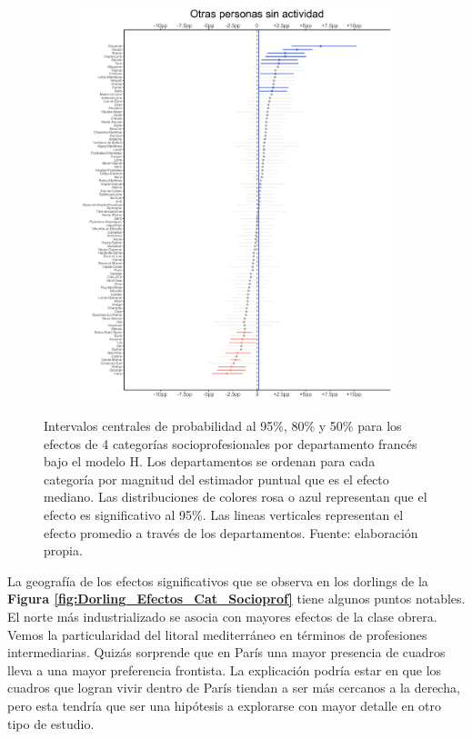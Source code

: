 \begin{figure}
\begin{subfigure}{0.45\textwidth}
	\end{subfigure}
	~
	\begin{subfigure}{0.45\textwidth}
	\includegraphics[width = \textwidth]{Figs/Efectos/Efectos_CSP8_Modelo_H}
	\end{subfigure}
	\caption{Intervalos centrales de probabilidad al 95\%, 80\% y 50\% para los efectos de 4 categorías socioprofesionales por departamento francés bajo el modelo H. Los departamentos se ordenan para cada categoría por magnitud del estimador puntual que es el efecto mediano. Las distribuciones de colores rosa o azul representan que el efecto es significativo al 95\%. Las lineas verticales representan el efecto promedio a través de los departamentos. Fuente: elaboración propia.}
	\label{fig:Efectos_Cat_Socioprof_2}
\end{figure}

La geografía de los efectos significativos que se observa en los dorlings de la \textbf{Figura \ref{fig:Dorling_Efectos_Cat_Socioprof}} tiene algunos puntos notables. El norte más industrializado se asocia con mayores efectos de la clase obrera. Vemos la particularidad del litoral mediterráneo en términos de profesiones intermediarias. Quizás sorprende que en París una mayor presencia de cuadros lleva a una mayor preferencia frontista. La explicación podría estar en que los cuadros que logran vivir dentro de París tiendan a ser más cercanos a la derecha, pero esta tendría que ser una hipótesis a explorarse con mayor detalle en otro tipo de estudio. 

